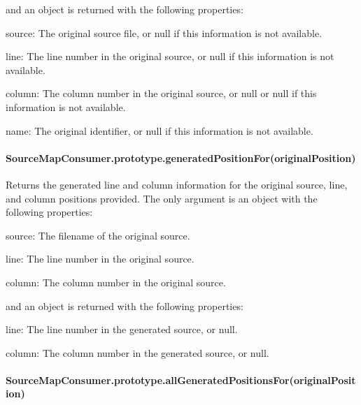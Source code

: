 and an object is returned with the following properties\+:


\begin{DoxyItemize}
\item {\ttfamily source}\+: The original source file, or null if this information is not available.
\item {\ttfamily line}\+: The line number in the original source, or null if this information is not available.
\item {\ttfamily column}\+: The column number in the original source, or null or null if this information is not available.
\item {\ttfamily name}\+: The original identifier, or null if this information is not available.
\end{DoxyItemize}

\paragraph*{Source\+Map\+Consumer.\+prototype.\+generated\+Position\+For(original\+Position)}

Returns the generated line and column information for the original source, line, and column positions provided. The only argument is an object with the following properties\+:


\begin{DoxyItemize}
\item {\ttfamily source}\+: The filename of the original source.
\item {\ttfamily line}\+: The line number in the original source.
\item {\ttfamily column}\+: The column number in the original source.
\end{DoxyItemize}

and an object is returned with the following properties\+:


\begin{DoxyItemize}
\item {\ttfamily line}\+: The line number in the generated source, or null.
\item {\ttfamily column}\+: The column number in the generated source, or null.
\end{DoxyItemize}

\paragraph*{Source\+Map\+Consumer.\+prototype.\+all\+Generated\+Positions\+For(original\+Position)}

